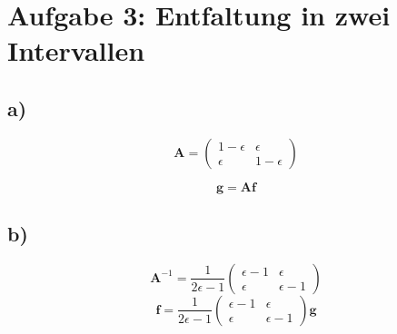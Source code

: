 \section*{Aufgabe 3: Entfaltung in zwei Intervallen}
\label{sec:Aufgabe3}
\subsection*{a)}
\begin{equation}
    \mathbf{A} =\left(\begin{matrix}
                    1 - \epsilon & \epsilon\\
                    \epsilon     & 1 - \epsilon
                 \end{matrix}\right)
\end{equation}

\begin{equation}
    \mathbf{g} = \mathbf{A f}
\end{equation}

\subsection*{b)}
\begin{equation}
    \mathbf{A}^{-1} = \frac{1}{2\epsilon-1} \left(\begin{matrix}
                    \epsilon - 1 & \epsilon\\
                    \epsilon     & \epsilon - 1
                 \end{matrix}\right)
\end{equation}
\begin{equation}
    \mathbf{f} = \frac{1}{2\epsilon-1} \left(\begin{matrix}
                    \epsilon - 1 & \epsilon\\
                    \epsilon     & \epsilon - 1
                 \end{matrix}\right) \mathbf{g}
\end{equation}

